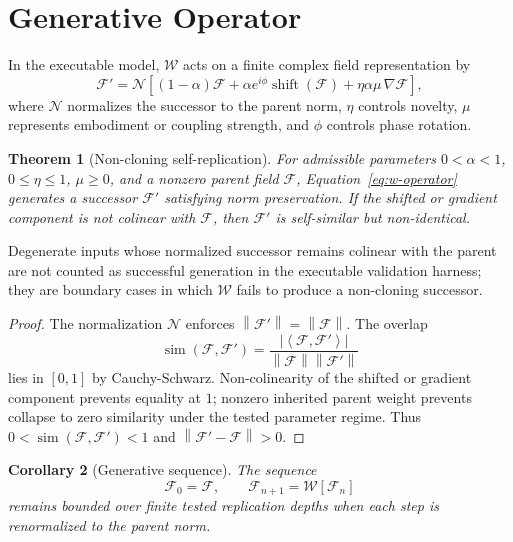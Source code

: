 \documentclass[12pt]{article}
\newtheorem{theorem}{Theorem}[section]
\newtheorem{corollary}[theorem]{Corollary}
\theoremstyle{remark}
\newcommand{\F}{\mathcal{F}}
\newcommand{\W}{\mathcal{W}}
\newcommand{\norm}[1]{\left\lVert #1 \right\rVert}
\newcommand{\inner}[2]{\left\langle #1,#2 \right\rangle}
\begin{document}
\section{Generative Operator}

In the executable model, $\W$ acts on a finite complex field representation by
\begin{equation}
  \F' =
  \mathcal{N}\!\left[
  (1-\alpha)\F
  +\alpha e^{i\phi}\operatorname{shift}(\F)
  +\eta\alpha\mu\,\nabla\F
  \right],
  \label{eq:w-operator}
\end{equation}
where $\mathcal{N}$ normalizes the successor to the parent norm, $\eta$
controls novelty, $\mu$ represents embodiment or coupling strength, and $\phi$
controls phase rotation.

\begin{theorem}[Non-cloning self-replication]
For admissible parameters $0<\alpha<1$, $0\leq\eta\leq1$, $\mu\geq0$, and a
nonzero parent field $\F$, Equation~\eqref{eq:w-operator} generates a successor
$\F'$ satisfying norm preservation.  If the shifted or gradient component is not
colinear with $\F$, then $\F'$ is self-similar but non-identical.
\end{theorem}

Degenerate inputs whose normalized successor remains colinear with the parent
are not counted as successful generation in the executable validation harness;
they are boundary cases in which $\W$ fails to produce a non-cloning successor.

\begin{proof}
The normalization $\mathcal{N}$ enforces $\norm{\F'}=\norm{\F}$.  The overlap
\begin{equation}
  \operatorname{sim}(\F,\F')
  =
  \frac{|\inner{\F}{\F'}|}
  {\norm{\F}\norm{\F'}}
\end{equation}
lies in $[0,1]$ by Cauchy-Schwarz.  Non-colinearity of the shifted or gradient
component prevents equality at $1$; nonzero inherited parent weight prevents
collapse to zero similarity under the tested parameter regime.  Thus
$0<\operatorname{sim}(\F,\F')<1$ and $\norm{\F'-\F}>0$.
\end{proof}

\begin{corollary}[Generative sequence]
The sequence
\begin{equation}
  \F_0=\F,\qquad \F_{n+1}=\W[\F_n]
\end{equation}
remains bounded over finite tested replication depths when each step is
renormalized to the parent norm.
\end{corollary}
\end{document}

